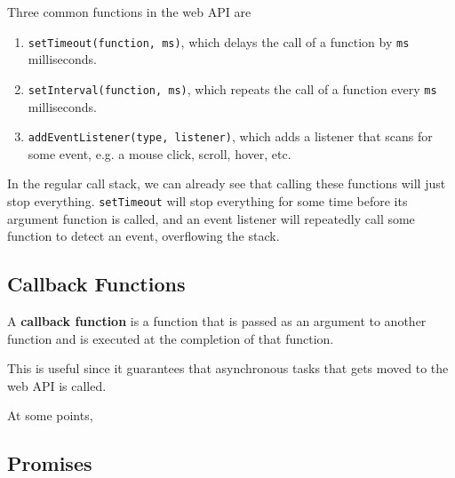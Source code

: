 \documentclass{article}
\begin{document}
  Three common functions in the web API are 
  \begin{enumerate}
    \item \texttt{setTimeout(function, ms)}, which delays the call of a function by \texttt{ms} milliseconds. 
    \item \texttt{setInterval(function, ms)}, which repeats the call of a function every \texttt{ms} milliseconds. 
    \item \texttt{addEventListener(type, listener)}, which adds a listener that scans for some event, e.g. a mouse click, scroll, hover, etc. 
  \end{enumerate}

  In the regular call stack, we can already see that calling these functions will just stop everything. \texttt{setTimeout} will stop everything for some time before its argument function is called, and an event listener will repeatedly call some function to detect an event, overflowing the stack.  

  \subsection{Callback Functions}

    \begin{definition}
      A \textbf{callback function} is a function that is passed as an argument to another function and is executed at the completion of that function. 
    \end{definition}

    This is useful since it guarantees that asynchronous tasks that gets moved to the web API is called. 

    \begin{definition}
      At some points,
    \end{definition}

  \subsection{Promises}
\end{document}
